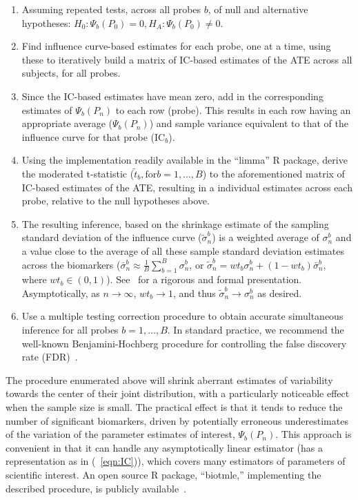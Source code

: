 \begin{enumerate}
\item Assuming repeated tests, across all probes $b$, of null and alternative
    hypotheses: $H_0: \Psi_b(P_0) = 0, H_A: \Psi_b(P_0) \ne 0 $.
\item Find influence curve-based estimates for each probe, one at a time, using
    these to iteratively build a matrix of IC-based estimates of the ATE across
    all subjects, for all probes.
\item Since the IC-based estimates have mean zero, add in the corresponding
    estimates of $\Psi_b(P_n)$ to each row (probe). This results in each row
    having an appropriate average ($\Psi_b(P_n)$) and sample variance
    equivalent to that of the influence curve for that probe ($\text{IC}_b$).
\item Using the implementation readily available in the ``limma'' R package,
    derive the moderated t-statistic ($\tilde{t}_b, \text{for} b = 1, \dots, B$)
    to the aforementioned matrix of IC-based estimates of the ATE, resulting in
    a individual estimates across each probe, relative to the null hypotheses
    above.
\item The resulting inference, based on the  shrinkage estimate of the
    sampling standard deviation of the influence curve ($\tilde{\sigma}^b_n$) is
    a weighted average of $\sigma^b_n$ and a value close to the average of all
    these sample standard deviation estimates across the biomarkers
    ($\bar{\sigma}^b_n \approx \frac{1}{B} \sum_{b = 1}^B \sigma^b_n$, or
    $\widetilde{\sigma}^b_n = wt_b \sigma^b_n+(1 - wt_b) \bar{\sigma}^b_n$,
    where $wt_b \in (0, 1)$). See~\cite{smyth2005limma} for a rigorous and
    formal presentation. Asymptotically, as $n \rightarrow \infty$,
    $wt_b \rightarrow 1$, and thus
    $\widetilde{\sigma}^b_n \rightarrow \sigma^b_n$ as desired.
\item Use a multiple testing correction procedure to obtain accurate
    simultaneous inference for all probes $b = 1, \dots, B$. In standard
    practice, we recommend the well-known Benjamini-Hochberg procedure for
    controlling the false discovery rate (FDR)~\cite{benjamini1995controlling}.
\end{enumerate}

The procedure enumerated above will shrink aberrant estimates of variability
towards the center of their joint distribution, with a particularly noticeable
effect when the sample size is small. The practical effect is that it tends to
reduce the number of significant biomarkers, driven by potentially erroneous
underestimates of the variation of the parameter estimates of interest,
$\Psi_b(P_n)$. This approach is convenient in that it can handle any
asymptotically linear estimator (has a representation as in (~\ref{eqn:IC})),
which covers many estimators of parameters of scientific interest. An open
source R package, ``biotmle,'' implementing the described procedure, is publicly
available~\cite{hejazi2017biotmle}.
